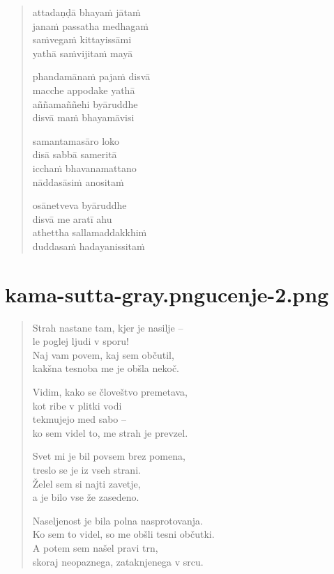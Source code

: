 

\cleartoverso

\vspace*{30mm}

\begin{verse}

attadaṇḍā bhayaṁ jātaṁ\\
janaṁ passatha medhagaṁ\\
saṁvegaṁ kittayissāmi\\
yathā saṁvijitaṁ mayā

phandamānaṁ pajaṁ disvā\\
macche appodake yathā\\
aññamaññehi byāruddhe\\
disvā maṁ bhayamāvisi

samantamasāro loko\\
disā sabbā sameritā\\
icchaṁ bhavanamattano\\
nāddasāsiṁ anositaṁ

osānetveva byāruddhe\\
disvā me aratī ahu\\
athettha sallamaddakkhiṁ\\
duddasaṁ hadayanissitaṁ

\end{verse}


\chapter[Attadaṇḍa Sutta]{{kama-sutta-gray.png}{ucenje-2.png}}

\begin{verse}


Strah nastane tam, kjer je nasilje --\\
le poglej ljudi v sporu!\\
Naj vam povem, kaj sem občutil,\\
kakšna tesnoba me je obšla nekoč.

Vidim, kako se človeštvo premetava,\\
kot ribe v plitki vodi\\
tekmujejo med sabo --\\
ko sem videl to, me strah je prevzel.

Svet mi je bil povsem brez pomena,\\
treslo se je iz vseh strani.\\
Želel sem si najti zavetje,\\
a je bilo vse že zasedeno.

Naseljenost je bila polna nasprotovanja.\\
Ko sem to videl, so me obšli tesni občutki.\\
A potem sem našel pravi trn,\\
skoraj neopaznega, zataknjenega v srcu.

\end{verse}

